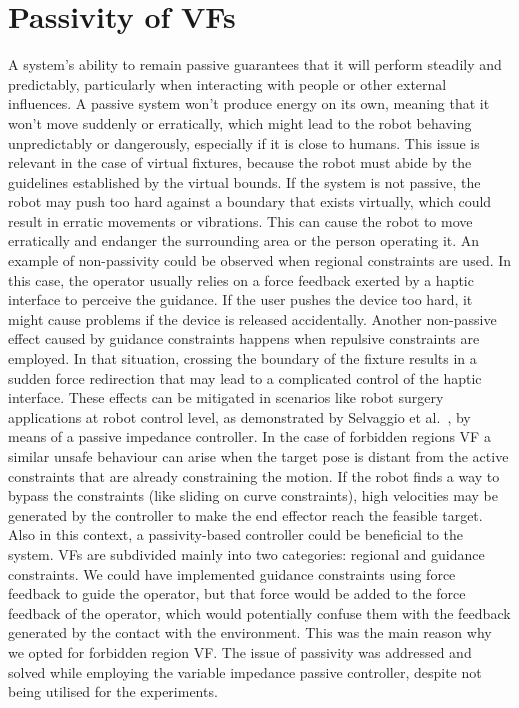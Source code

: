 \section{Passivity of VFs}
A system's ability to remain passive guarantees that it will perform steadily and predictably, particularly when interacting with people or other external influences. A passive system won't produce energy on its own, meaning that it won't move suddenly or erratically, which might lead to the robot behaving unpredictably or dangerously, especially if it is close to humans.
This issue is relevant in the case of virtual fixtures, because the robot must abide by the guidelines established by the virtual bounds. If the system is not passive, the robot may push too hard against a boundary that exists virtually, which could result in erratic movements or vibrations. This can cause the robot to move erratically and endanger the surrounding area or the person operating it. An example of non-passivity could be observed when regional constraints are used. In this case, the operator usually relies on a force feedback exerted by a haptic interface to perceive the guidance. If the user pushes the device too hard, it might cause problems if the device is released accidentally. Another non-passive effect caused by guidance constraints happens when repulsive constraints are employed. In that situation, crossing the boundary of the fixture results in a sudden force redirection that may lead to a complicated control of the haptic interface. These effects can be mitigated in scenarios like robot surgery applications at robot control level, as demonstrated by Selvaggio et al.~\cite{selvaggio2018passive},  by means of a passive impedance controller. In the case of forbidden regions VF a similar unsafe behaviour can arise when the target pose is distant from the active constraints that are already constraining the motion. If the robot finds a way to bypass the constraints (like sliding on curve constraints), high velocities may be generated by the controller to make the end effector reach the feasible target. Also in this context, a passivity-based controller could be beneficial to the system. VFs are subdivided mainly into two categories: regional and guidance constraints. We could have implemented guidance constraints using force feedback to guide the operator, but that force would be added to the force feedback of the operator, which would potentially confuse them with the feedback generated by the contact with the environment.
This was the main reason why we opted for forbidden region VF. The issue of passivity was addressed and solved while employing the variable impedance passive controller, despite not being utilised for the experiments.


